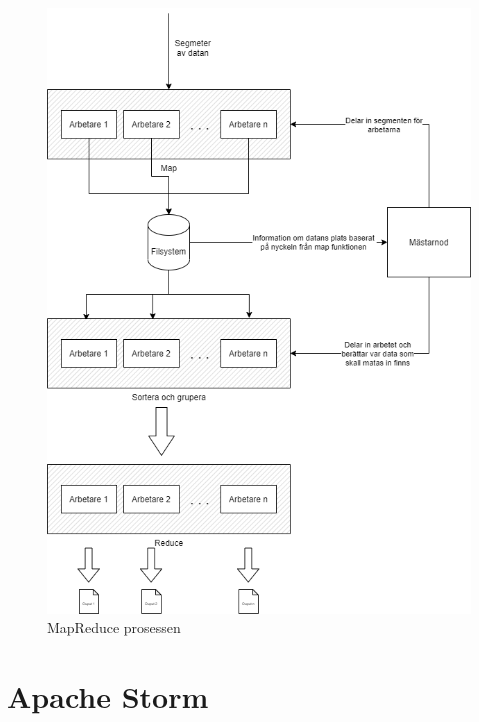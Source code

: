 \begin{figure}[h]
    \centering
    \includegraphics[scale=0.5]{img/map-reduce.png}
    \caption{MapReduce prosessen}
    \label{fig:mesh1}
\end{figure}

\section{Apache Storm}

